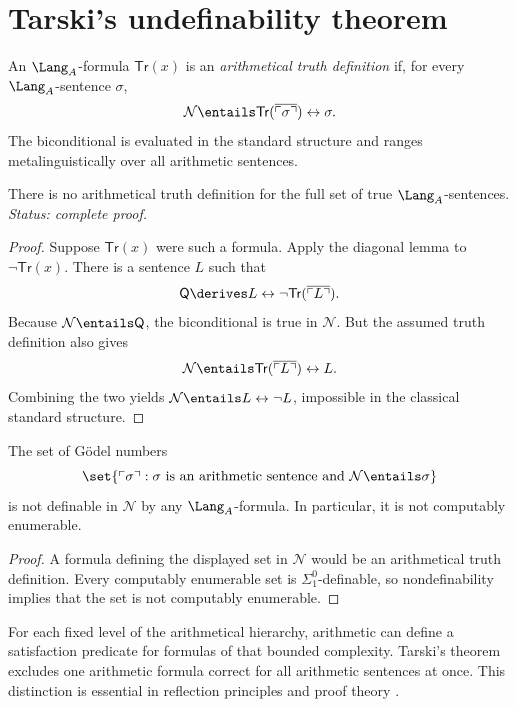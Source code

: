 \section{Tarski's undefinability theorem}
\label{sec:second-incompleteness-04}

\begin{definition}
An \(\Lang_A\)-formula \(\mathsf{Tr}(x)\) is an \emph{arithmetical truth
definition} if, for every \(\Lang_A\)-sentence \(\sigma\),
\[
  \mathcal N\entails
  \mathsf{Tr}(\overline{\ulcorner\sigma\urcorner})
  \leftrightarrow\sigma.
\]
The biconditional is evaluated in the standard structure and ranges
metalinguistically over all arithmetic sentences.
\end{definition}

\begin{theorem}
\label{thm:tarski-undefinability}
There is no arithmetical truth definition for the full set of true
\(\Lang_A\)-sentences.
\textit{Status: complete proof.}
\end{theorem}

\begin{proof}
Suppose \(\mathsf{Tr}(x)\) were such a formula.  Apply the diagonal lemma to
\(\neg\mathsf{Tr}(x)\).  There is a sentence \(L\) such that
\[
  \mathsf Q\derives
  L\leftrightarrow
  \neg\mathsf{Tr}(\overline{\ulcorner L\urcorner}).
\]
Because \(\mathcal N\entails\mathsf Q\), the biconditional is true in
\(\mathcal N\).  But the assumed truth definition also gives
\[
  \mathcal N\entails
  \mathsf{Tr}(\overline{\ulcorner L\urcorner})\leftrightarrow L.
\]
Combining the two yields
\(\mathcal N\entails L\leftrightarrow\neg L\), impossible in the classical
standard structure.
\end{proof}

\begin{corollary}
The set of G\"odel numbers
\[
  \set{\ulcorner\sigma\urcorner:
  \sigma\text{ is an arithmetic sentence and }
  \mathcal N\entails\sigma}
\]
is not definable in \(\mathcal N\) by any \(\Lang_A\)-formula.  In
particular, it is not computably
enumerable.
\end{corollary}

\begin{proof}
A formula defining the displayed set in \(\mathcal N\) would be an
arithmetical truth
definition.  Every computably enumerable set is \(\Sigma^0_1\)-definable, so
nondefinability implies that the set is not computably enumerable.
\end{proof}

\begin{remark}
For each fixed level of the arithmetical hierarchy, arithmetic can define a
satisfaction predicate for formulas of that bounded complexity.  Tarski's
theorem excludes one arithmetic formula correct for all arithmetic sentences
at once.  This distinction is essential in reflection principles and proof
theory \cite{Tarski1983}.
\end{remark}

